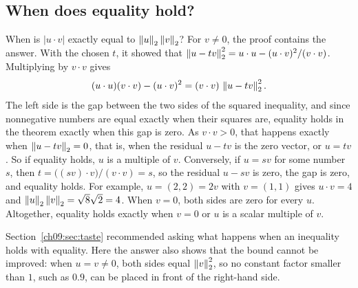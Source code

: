 \subsection*{When does equality hold?}
When is $|u\cdot v|$ exactly equal to $\left\|u\right\|_2\left\|v\right\|_2$? For $v\ne0$, the proof contains the answer. With the chosen $t$, it showed that $\left\|u-tv\right\|_2^2=u\cdot u-(u\cdot v)^2/(v\cdot v)$. Multiplying by $v\cdot v$ gives
\[
 (u\cdot u)(v\cdot v)-(u\cdot v)^2
 =(v\cdot v)\,\left\|u-tv\right\|_2^2.
\]
The left side is the gap between the two sides of the squared inequality, and since nonnegative numbers are equal exactly when their squares are, equality holds in the theorem exactly when this gap is zero. As $v\cdot v>0$, that happens exactly when $\left\|u-tv\right\|_2=0$, that is, when the residual $u-tv$ is the zero vector, or $u=tv$. So if equality holds, $u$ is a multiple of $v$. Conversely, if $u=sv$ for some number $s$, then $t=\bigl((sv)\cdot v\bigr)/(v\cdot v)=s$, so the residual $u-sv$ is zero, the gap is zero, and equality holds. For example, $u=(2,2)=2v$ with $v=(1,1)$ gives $u\cdot v=4$ and $\left\|u\right\|_2\left\|v\right\|_2=\sqrt8\sqrt2=4$. When $v=0$, both sides are zero for every $u$. Altogether, equality holds exactly when $v=0$ or $u$ is a scalar multiple of $v$.

Section~\ref{ch09:sec:taste} recommended asking what happens when an inequality holds with equality. Here the answer also shows that the bound cannot be improved: when $u=v\ne0$, both sides equal $\left\|v\right\|_2^2$, so no constant factor smaller than $1$, such as $0.9$, can be placed in front of the right-hand side.

